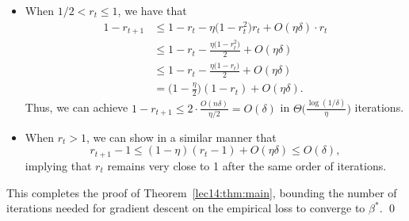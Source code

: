 \begin{itemize}
    \item When $1/2 < r_t \leq 1$, we have that
    \begin{align}
        1 - r_{t+1} &\leq 1 - r_t - \eta \big(1 - r_t^2\big) r_t + O(\eta\delta) \cdot r_t \\
        &\leq 1 - r_t - \frac{\eta \big(1 - r_t^2\big)}{2} + O(\eta\delta) \\
        &\leq 1 - r_t - \frac{\eta \big(1 - r_t\big)}{2} + O(\eta\delta) \\
        &= \bigg(1 - \frac{\eta}{2}\bigg) (1 - r_t) + O(\eta\delta).
    \end{align}
    Thus, we can achieve $1 - r_{t+1} \leq 2 \cdot \frac{O(n\delta)}{\eta/2} = O(\delta)$ in $\Theta\Big(\frac{\log(1/\delta)}{\eta}\Big)$ iterations.
    
    \item When $r_t > 1$, we can show in a similar manner that
    \begin{equation}
        r_{t+1} - 1 \leq (1 - \eta) (r_t - 1) + O(\eta\delta) \leq O(\delta),
    \end{equation} 
    implying that $r_t$ remains very close to 1 after the same order of iterations.
\end{itemize}

This completes the proof of Theorem~\ref{lec14:thm:main}, bounding the number of iterations needed for gradient descent on the empirical loss to converge to $\beta^*$.
\qed 
